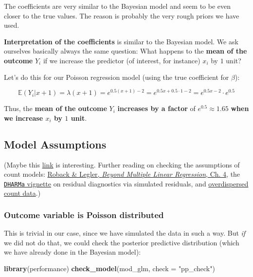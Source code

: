 \documentclass[
]{book}
\newenvironment{Shaded}{\begin{snugshade}}{\end{snugshade}}
\newcommand{\AttributeTok}[1]{\textcolor[rgb]{0.13,0.29,0.53}{#1}}
\newcommand{\FunctionTok}[1]{\textcolor[rgb]{0.13,0.29,0.53}{\textbf{#1}}}
\newcommand{\NormalTok}[1]{#1}
\newcommand{\StringTok}[1]{\textcolor[rgb]{0.31,0.60,0.02}{#1}}
\begin{document}
The coefficients are very similar to the Bayesian model and seem to be even
closer to the true values.
The reason is probably the very rough priors we have used.

\textbf{Interpretation of the coefficients} is similar to the Bayesian model.
We ask ourselves basically always the same question: What happens to the \textbf{mean of the outcome} \(Y_i\)
if we increase the predictor (of interest, for instance) \(x_i\) by \(1\) unit?

Let's do this for our Poisson regression model (using the true coefficient for \(\beta\)):

\[\mathbb{E}(Y_i | x+1) = \lambda(x+1) = e^{0.5(x+1)-2} = e^{0.5x + 0.5 \cdot 1 - 2} = e^{0.5x-2} \cdot e^{0.5}\]

Thus, the \textbf{mean of the outcome} \(Y_i\) \textbf{increases by a factor} of \(e^{0.5} \approx 1.65\)
\textbf{when we increase \(x_i\) by \(1\) unit}.

\subsection{Model Assumptions}\label{model-assumptions}

(Maybe this \href{https://cambiotraining.github.io/stats-glm/materials/glm-11-checking-assumptions.html}{link}
is interesting. Further reading on checking the assumptions of count models:
\href{https://bookdown.org/roback/bookdown-BeyondMLR/ch-poissonreg.html\#poisson-regression-assumptions}{Roback \& Legler, \emph{Beyond Multiple Linear Regression}, Ch. 4},
the \href{https://cran.r-project.org/web/packages/DHARMa/vignettes/DHARMa.html}{\texttt{DHARMa} vignette}
on residual diagnostics via simulated residuals, and
\href{https://cambiotraining.github.io/stats-glm/materials/glm-13-overdispersed-count-data.html}{overdispersed count data}.)

\subsubsection{Outcome variable is Poisson distributed}\label{outcome-variable-is-poisson-distributed}

This is trivial in our case, since we have simulated the data in such a way.
But \emph{if} we did not do that, we could check the posterior predictive distribution
(which we have already done in the Bayesian model):

\begin{Shaded}
\begin{Highlighting}[]
\FunctionTok{library}\NormalTok{(performance)}
\FunctionTok{check\_model}\NormalTok{(mod\_glm, }\AttributeTok{check =} \StringTok{"pp\_check"}\NormalTok{)}
\end{Highlighting}
\end{Shaded}
\end{document}
